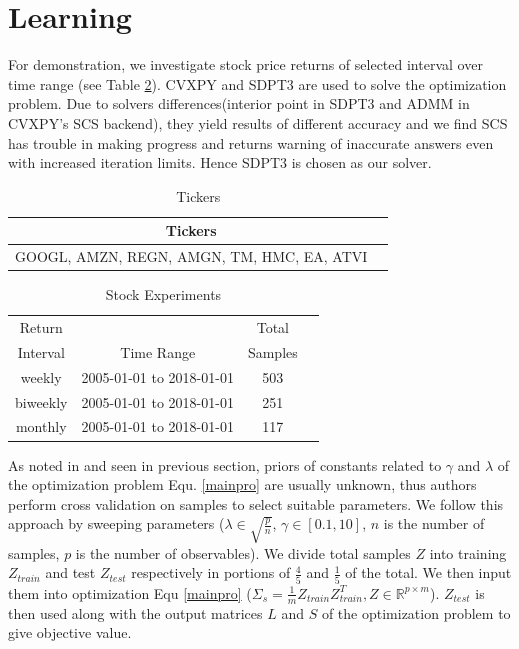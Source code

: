 \documentclass[10pt,conference]{IEEEtran}
\newcommand{\R}{\mathbb{R}}
\begin{document}
\section{Learning} \label{learning}
For demonstration, we investigate stock price returns of selected interval over time range (see Table \ref{table:stock_experiments}). CVXPY\cite{Diamond} and SDPT3\cite{sdpt3} are used to solve the optimization problem. Due to solvers differences(interior point in SDPT3 and ADMM in CVXPY's SCS backend), they yield results of different accuracy and we find SCS has trouble in making progress and returns warning of inaccurate answers even with increased iteration limits. Hence SDPT3 is chosen as our solver.
\begin{table}[h]
    \centering
    \begin{tabular}{|c|c|}
        \hline
         Tickers \\ \hline
         GOOGL, AMZN, REGN, AMGN, TM, HMC, EA, ATVI\\ \hline
    \end{tabular}
    \caption{Tickers}
    \label{table:ticker_groups}
\end{table}
\begin{table}[h]
    \centering
    \begin{tabular}{|c|c|c|c|}
        \hline
         Return  & & Total\\
         Interval & Time Range & Samples\\ \hline
         weekly & 2005-01-01 to 2018-01-01 & 503\\ \hline
         biweekly & 2005-01-01 to 2018-01-01 & 251\\ \hline
         monthly & 2005-01-01 to 2018-01-01 & 117\\ \hline
    \end{tabular}
    \caption{Stock Experiments}
    \label{table:stock_experiments}
\end{table}
As noted in \cite{Chandra_2} and seen in previous section, priors of constants related to $\gamma$ and $\lambda$ of the optimization problem Equ. \ref{mainpro} are usually unknown, thus authors perform cross validation on samples to select suitable parameters. We follow this approach by sweeping parameters ($\lambda \in \sqrt{\frac{p}{n}}$, $\gamma \in [0.1,10]$, $n$ is the number of samples, $p$ is the number of observables). We divide total samples $Z$ into training $Z_{train}$ and test $Z_{test}$ respectively in portions of $\frac{4}{5}$ and $\frac{1}{5}$ of the total. We then input them into optimization Equ \ref{mainpro} ($\Sigma_s = \frac{1}{m} Z_{train}Z_{train}^T, Z \in \R^{p \times m}$). $Z_{test}$ is then used along with the output matrices $L$ and $S$ of the optimization problem to give objective value.
\end{document}
